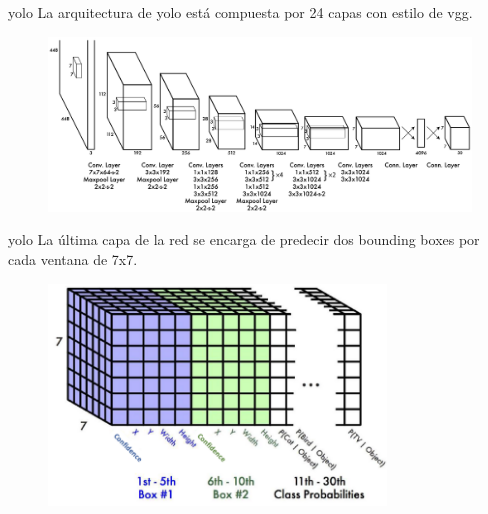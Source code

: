 \begin{frame}{\gls{yolo}}
La arquitectura de \alert{\gls{yolo}} está compuesta por \alert{24 capas} con estilo de \alert{\gls{vgg}}.

\begin{figure}
    \centering
    \includegraphics[width=\textwidth]{Slides/figures/Tema 4/YOLO_Architecture.png}
    \caption{\cite{redmon2016you}}
\end{figure}
\end{frame}

\begin{frame}{\gls{yolo}}
La \alert{última capa} de la red se encarga de \alert{predecir} dos \alert{bounding boxes} por cada \alert{ventana} de 7x7.

\begin{figure}
    \centering
    \includegraphics[width=0.8\textwidth]{Slides/figures/Tema 4/YOLO_End.png}
    \caption{\cite{YOLOFinal}}
\end{figure}
\end{frame}

